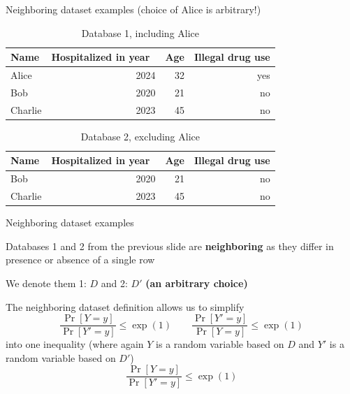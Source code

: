 \documentclass[12pt,aspectratio=169,handout]{beamer}
\begin{document}
\begin{frame}{Neighboring dataset examples (choice of Alice is arbitrary!)}


\begin{table}
	\footnotesize
	\begin{tabular}{lrrr} \toprule
		Name & Hospitalized in year & Age & Illegal drug use \\ \midrule
		Alice & 2024 & 32 & yes \\
		Bob & 2020 & 21 & no \\
		Charlie & 2023 & 45 & no \\ \bottomrule
	\end{tabular}
	\caption{Database 1, including Alice}
\end{table}

\begin{table}
	\footnotesize
	\begin{tabular}{lrrr} \toprule
		Name & Hospitalized in year & Age & Illegal drug use \\ \midrule
		Bob & 2020 & 21 & no \\
		Charlie & 2023 & 45 & no \\ \bottomrule
	\end{tabular}
	\caption{Database 2, excluding Alice}
\end{table}
	
\end{frame}

\begin{frame}{Neighboring dataset examples}

Databases 1 and 2 from the previous slide are \textbf{neighboring} as they differ in presence or absence of a single row

We denote them 1: $D$ and 2: $D'$ \textbf{(an arbitrary choice)}

The neighboring dataset definition allows us to simplify
$$
\frac{\Pr[Y = y]}{\Pr[Y' = y]} \leq \exp(1) \qquad
\frac{\Pr[Y' = y]}{\Pr[Y = y]} \leq \exp(1)
$$
into one inequality (where again $Y$ is a random variable based on $D$ and $Y'$ is a random variable based on $D'$)
$$
\frac{\Pr[Y = y]}{\Pr[Y' = y]} \leq \exp(1)
$$

\end{frame}
\end{document}
